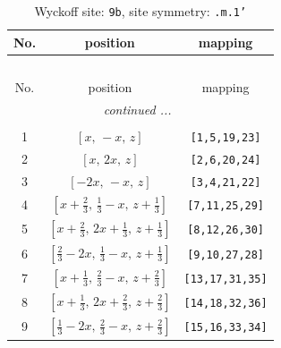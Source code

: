 \documentclass[fleqn,8pt]{jsarticle}
\begin{document}
\begin{longtable}{ccc}
\caption{Wyckoff site: {\tt 9b}, site symmetry: {\tt .m.1'}}
 \\
 \hline \hline
No. & position & mapping \\ \hline \endfirsthead

\multicolumn{2}{l}{\tablename\ \thetable{}} \\
 \hline \hline
No. & position & mapping \\ \hline \endhead

 \hline \hline
\multicolumn{2}{r}{\footnotesize\it continued ...} \\ \endfoot

 \hline \hline
\multicolumn{2}{r}{} \\ \endlastfoot

1 & $\left[ x,\, - x,\, z \right]$ & {\tt [1,5,19,23]} \\ \hline
2 & $\left[ x,\, 2 x,\, z \right]$ & {\tt [2,6,20,24]} \\ \hline
3 & $\left[ - 2 x,\, - x,\, z \right]$ & {\tt [3,4,21,22]} \\ \hline
4 & $\left[ x + \frac{2}{3},\, \frac{1}{3} - x,\, z + \frac{1}{3} \right]$ & {\tt [7,11,25,29]} \\ \hline
5 & $\left[ x + \frac{2}{3},\, 2 x + \frac{1}{3},\, z + \frac{1}{3} \right]$ & {\tt [8,12,26,30]} \\ \hline
6 & $\left[ \frac{2}{3} - 2 x,\, \frac{1}{3} - x,\, z + \frac{1}{3} \right]$ & {\tt [9,10,27,28]} \\ \hline
7 & $\left[ x + \frac{1}{3},\, \frac{2}{3} - x,\, z + \frac{2}{3} \right]$ & {\tt [13,17,31,35]} \\ \hline
8 & $\left[ x + \frac{1}{3},\, 2 x + \frac{2}{3},\, z + \frac{2}{3} \right]$ & {\tt [14,18,32,36]} \\ \hline
9 & $\left[ \frac{1}{3} - 2 x,\, \frac{2}{3} - x,\, z + \frac{2}{3} \right]$ & {\tt [15,16,33,34]} \\
\end{longtable}
\renewcommand{\arraystretch}{1.2}
\end{document}

